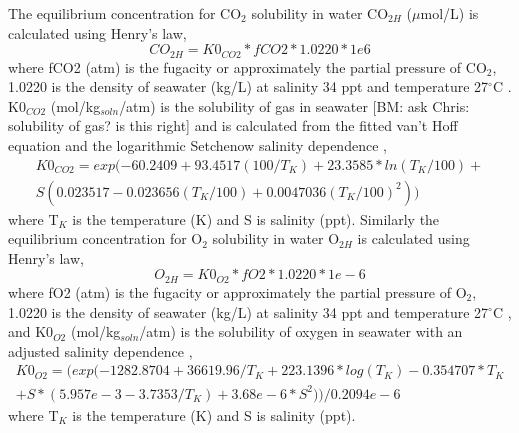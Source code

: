 \documentclass{ruthesis}
\begin{document}
The equilibrium concentration for CO$_2$ solubility in water CO$_{2H}$ ($\mu$mol/L) is calculated using Henry's law,
\begin{equation}\label{eq:CO2H_eq}
CO_{2H}=K0_{CO2}*fCO2*1.0220*1e6
\end{equation}
where fCO2 (atm) is the fugacity or approximately the partial pressure of CO$_2$, 1.0220 is the density of seawater (kg/L) at salinity 34 ppt and temperature 27$^{\circ}$C \cite{ramsing2011seawater} \cite{greensberg1992standard}. K0$_{CO2}$ (mol/kg$_{soln}$/atm) is the solubility of gas in seawater [BM: ask Chris: solubility of gas? is this right] and is calculated from the fitted van't Hoff equation and the logarithmic Setchenow salinity dependence \cite{weiss1974carbon},
\begin{equation}
\begin{aligned}
K0_{CO2} = exp(- 60.2409 + 93.4517(100/T_K)  + 23.3585*ln(T_K/100)+ \\
S(0.023517 - 0.023656(T_K/100) + 0.0047036(T_K/100)^2))
\end{aligned}
\end{equation}
where T$_K$ is the temperature (K) and S is salinity (ppt).
Similarly the equilibrium concentration for O$_2$ solubility in water O$_{2H}$ is calculated using Henry's law,
\begin{equation}\label{eq:O2H_eq}
O_{2H}=K0_{O2}*fO2*1.0220*1e-6
\end{equation}
where fO2 (atm) is the fugacity or approximately the partial pressure of O$_2$, 1.0220 is the density of seawater (kg/L) at salinity 34 ppt and temperature 27$^{\circ}$C \cite{ramsing2011seawater} \cite{greensberg1992standard}, and K0$_{O2}$ (mol/kg$_{soln}$/atm) is the solubility of oxygen in seawater with an adjusted salinity dependence \cite{battino1983solubility},
\begin{equation}
\begin{aligned}
K0_{O2} =  (exp(-1282.8704 + 36619.96/T_K + 223.1396*log(T_K) -0.354707*T_K \\
+ S*(5.957e-3 -3.7353/T_K) + 3.68e-6*S^2))/0.2094e-6
\end{aligned}
\end{equation}
where T$_K$ is the temperature (K) and S is salinity (ppt).
\end{document}
